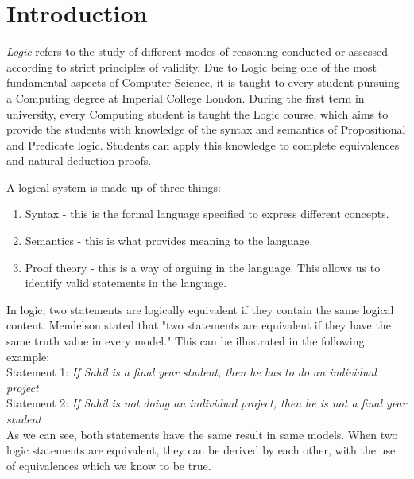 \documentclass{report}
\begin{document}

\tableofcontents


\chapter{Introduction}

\emph{Logic} refers to the study of different modes of reasoning conducted or 
assessed according to strict principles of validity. Due to Logic being one of 
the most fundamental aspects of Computer Science, it is taught to every student
pursuing a Computing degree at Imperial College London. During the first term 
in university, every Computing student is taught the Logic course, which aims to
provide the students with knowledge of the syntax and semantics of Propositional 
and Predicate logic. Students can apply this knowledge to complete equivalences
and natural deduction proofs.

A logical system is made up of three things:

\begin{enumerate}
  \item Syntax - this is the formal language specified to express different
         concepts.
  \item Semantics - this is what provides meaning to the language.
  \item Proof theory - this is a way of arguing in the language. This allows us
         to identify valid statements in the language.
\end{enumerate}

In logic, two statements are logically equivalent if they contain the same
logical content. Mendelson stated that "two statements are equivalent if they
have the same truth value in every model." This can be illustrated in the 
following example: \\ \bigskip 
Statement 1: \emph{If Sahil is a final year student, 
then he has to do an individual project} \\ \bigskip 
Statement 2: \emph{If Sahil is not 
doing an individual project, then he is not a final year student} \\ \bigskip 
As we can see, both statements have the same result in same models. When two logic 
statements are equivalent, they can be derived by each other, with the use of 
equivalences which we know to be true.
\end{document}
